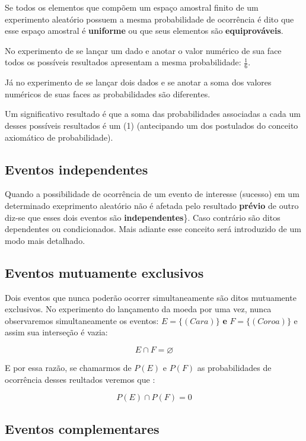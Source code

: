 \documentclass[
]{book}
\begin{document}
Se todos os elementos que compõem um espaço amostral finito de um experimento aleatório possuem a mesma probabilidade de ocorrência é dito que esse espaço amostral é \textbf{uniforme} ou que seus elementos são \textbf{equiprováveis}.

No experimento de se lançar um dado e anotar o valor numérico de sua face todos os possíveis resultados apresentam a mesma probabilidade: \(\frac{1}{6}\).

Já no experimento de se lançar dois dados e se anotar a soma dos valores numéricos de suas faces as probabilidades são diferentes.

Um significativo resultado é que a soma das probabilidades associadas a cada um desses possíveis resultados é um (1) (antecipando um dos postulados do conceito axiomático de probabilidade).

\hypertarget{eventos-independentes}{%
\subsection{Eventos independentes}\label{eventos-independentes}}

\hfill\break

Quando a possibilidade de ocorrência de um evento de interesse (sucesso) em um determinado exeprimento aleatório não é afetada pelo resultado \textbf{prévio} de outro diz-se que esses dois eventos são \textbf{independentes}\}. Caso contrário são ditos dependentes ou condicionados. Mais adiante esse conceito será introduzido de um modo mais detalhado.

\hypertarget{eventos-mutuamente-exclusivos}{%
\subsection{Eventos mutuamente exclusivos}\label{eventos-mutuamente-exclusivos}}

Dois eventos que nunca poderão ocorrer simultaneamente são ditos mutuamente exclusivos. No experimento do lançamento da moeda por uma vez, nunca observaremos simultaneamente os eventos: \(E=\{(Cara)\}\) \textbf{e} \(F=\{(Coroa)\}\) e assim sua interseção é vazia:

\[
E \cap F = \varnothing 
\]

E por essa razão, se chamarmos de \(P(E)\) e \(P(F)\) as probabilidades de ocorrência desses reultados veremos que :

\[
P(E) \cap P(F) = 0
\]

\hypertarget{eventos-complementares}{%
\subsection{Eventos complementares}\label{eventos-complementares}}
\end{document}
